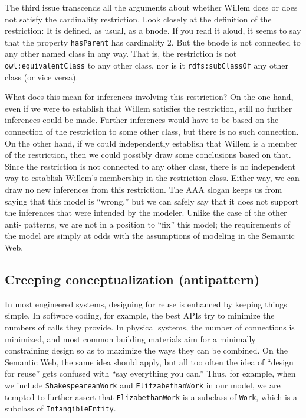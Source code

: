 The third issue transcends all the arguments about whether Willem does
or does not satisfy the
cardinality restriction. Look closely at the definition of the
restriction: It is defined, as usual, as a bnode. If you read it aloud, it seems to say that the property \texttt{hasParent} has cardinality 2. But the bnode is not
connected to any other named class in any way. That is, the restriction
is not \texttt{owl:equivalentClass} to any other class, nor is it \texttt{rdfs:subClassOf}
any other class (or vice versa).

What does this mean for inferences involving this restriction? On the
one hand, even if we were to establish that Willem satisfies the
restriction, still no further inferences could be made. Further
inferences would have to be based on the connection of the restriction
to some other class, but there is no such connection. On the other hand,
if we could independently establish that Willem is a member of the
restriction, then we could possibly draw some conclusions based on that.
Since the restriction is not connected to any other class, there is no
independent way to establish Willem's membership in the restriction
class. Either way, we can draw no new inferences from this restriction.
The AAA slogan keeps us from saying that this model is ``wrong,'' but we
can safely say that it does not support the inferences that were
intended by the modeler. Unlike the case of the other anti- patterns, we
are not in a position to ``fix'' this model; the requirements of the
model are simply at odds with the assumptions of modeling in the
Semantic Web.

\subsection{Creeping conceptualization (antipattern)}

In most engineered systems, designing for reuse is enhanced by keeping
things simple. In software coding, for example, the best APIs try to
minimize the numbers of calls they provide. In physical systems, the
number of connections is minimized, and most common building materials
aim for a minimally constraining design so as to maximize the ways they
can be combined. On the Semantic Web, the same idea should apply, but
all too often the idea of ``design for reuse'' gets confused with ``say
everything you can.'' Thus, for example, when we include
\texttt{ShakespeareanWork} and \texttt{ElifzabethanWork} in our model, we are tempted to
further assert that \texttt{ElizabethanWork} is a subclass of \texttt{Work}, which is a
subclass of \texttt{IntangibleEntity}.

